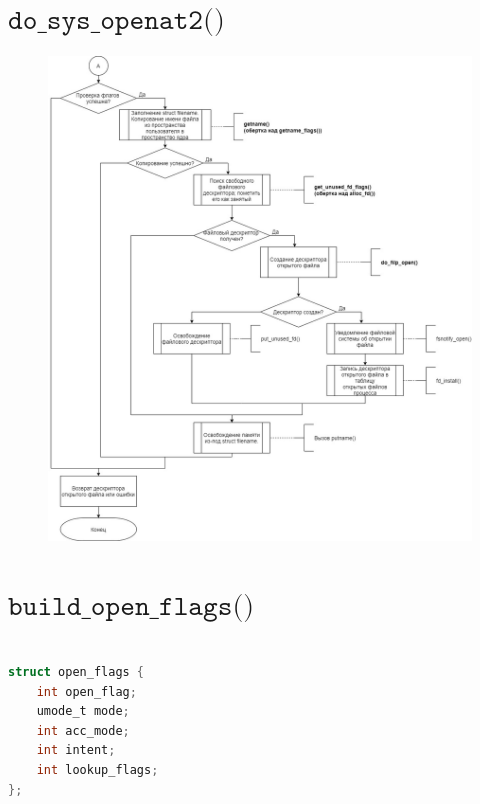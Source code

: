 \documentclass[a4paper,14pt]{extreport}
\begin{document}
\section{$\texttt{do\_sys\_openat2()}$}
\begin{figure}[H]
	\centering
	\includegraphics[scale=0.45]{img/open2.jpg}
\end{figure}










\section{$\texttt{build\_open\_flags()}$}

\begin{lstlisting}[language=c, caption=Структура open\_flags]

struct open_flags {
	int open_flag;
	umode_t mode;
	int acc_mode;
	int intent;
	int lookup_flags;
};
\end{lstlisting}
\end{document}
